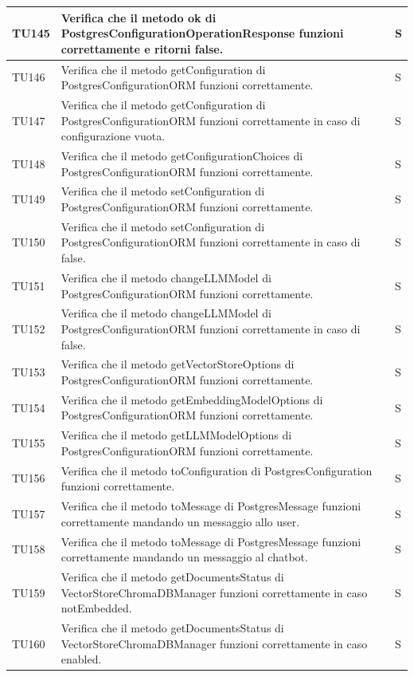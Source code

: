 \documentclass[10pt, a4paper]{article}
\begin{document}
\begin{xltabular}{\textwidth}{p{0.12\textwidth}|p{0.7\textwidth}|X}
\hline
TU145 & Verifica che il metodo ok di PostgresConfigurationOperationResponse funzioni correttamente e ritorni false. & S \\
\hline
TU146 & Verifica che il metodo getConfiguration di PostgresConfigurationORM funzioni correttamente. & S \\
\hline
TU147 & Verifica che il metodo getConfiguration di PostgresConfigurationORM funzioni correttamente in caso di configurazione vuota. & S \\
\hline
TU148 & Verifica che il metodo getConfigurationChoices di PostgresConfigurationORM funzioni correttamente. & S \\
\hline
TU149 & Verifica che il metodo setConfiguration di PostgresConfigurationORM funzioni correttamente. & S \\
\hline
TU150 & Verifica che il metodo setConfiguration di PostgresConfigurationORM funzioni correttamente in caso di false. & S \\
\hline
TU151 & Verifica che il metodo changeLLMModel di PostgresConfigurationORM funzioni correttamente. & S \\
\hline
TU152 & Verifica che il metodo changeLLMModel di PostgresConfigurationORM funzioni correttamente in caso di false. & S \\
\hline
TU153 & Verifica che il metodo getVectorStoreOptions di PostgresConfigurationORM funzioni correttamente. & S \\
\hline
TU154 & Verifica che il metodo getEmbeddingModelOptions di PostgresConfigurationORM funzioni correttamente. & S \\
\hline
TU155 & Verifica che il metodo getLLMModelOptions di PostgresConfigurationORM funzioni correttamente. & S \\
\hline
TU156 & Verifica che il metodo toConfiguration di PostgresConfiguration funzioni correttamente. & S \\
\hline
TU157 & Verifica che il metodo toMessage di PostgresMessage funzioni correttamente mandando un messaggio allo user. & S \\
\hline
TU158 & Verifica che il metodo toMessage di PostgresMessage funzioni correttamente mandando un messaggio al chatbot. & S \\
\hline
TU159 & Verifica che il metodo getDocumentsStatus di VectorStoreChromaDBManager funzioni correttamente in caso notEmbedded. & S \\
\hline
TU160 & Verifica che il metodo getDocumentsStatus di VectorStoreChromaDBManager funzioni correttamente in caso enabled. & S \\

\end{xltabular}
\end{document}
